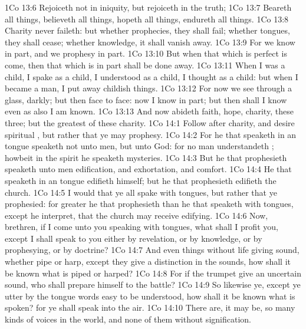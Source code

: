 \vs 1Co 13:6 Rejoiceth not in iniquity, but rejoiceth in the truth;
\vs 1Co 13:7 Beareth all things, believeth all things, hopeth all things, endureth all things.
\vs 1Co 13:8 Charity never faileth: but whether  prophecies, they shall fail; whether  tongues, they shall cease; whether  knowledge, it shall vanish away.
\vs 1Co 13:9 For we know in part, and we prophesy in part.
\vs 1Co 13:10 But when that which is perfect is come, then that which is in part shall be done away.
\vs 1Co 13:11 When I was a child, I spake as a child, I understood as a child, I thought as a child: but when I became a man, I put away childish things.
\vs 1Co 13:12 For now we see through a glass, darkly; but then face to face: now I know in part; but then shall I know even as also I am known.
\vs 1Co 13:13 And now abideth faith, hope, charity, these three; but the greatest of these  charity.
\vs 1Co 14:1 Follow after charity, and desire spiritual , but rather that ye may prophesy.
\vs 1Co 14:2 For he that speaketh in an  tongue speaketh not unto men, but unto God: for no man understandeth ; howbeit in the spirit he speaketh mysteries.
\vs 1Co 14:3 But he that prophesieth speaketh unto men  edification, and exhortation, and comfort.
\vs 1Co 14:4 He that speaketh in an  tongue edifieth himself; but he that prophesieth edifieth the church.
\vs 1Co 14:5 I would that ye all spake with tongues, but rather that ye prophesied: for greater  he that prophesieth than he that speaketh with tongues, except he interpret, that the church may receive edifying.
\vs 1Co 14:6 Now, brethren, if I come unto you speaking with tongues, what shall I profit you, except I shall speak to you either by revelation, or by knowledge, or by prophesying, or by doctrine?
\vs 1Co 14:7 And even things without life giving sound, whether pipe or harp, except they give a distinction in the sounds, how shall it be known what is piped or harped?
\vs 1Co 14:8 For if the trumpet give an uncertain sound, who shall prepare himself to the battle?
\vs 1Co 14:9 So likewise ye, except ye utter by the tongue words easy to be understood, how shall it be known what is spoken? for ye shall speak into the air.
\vs 1Co 14:10 There are, it may be, so many kinds of voices in the world, and none of them  without signification.
